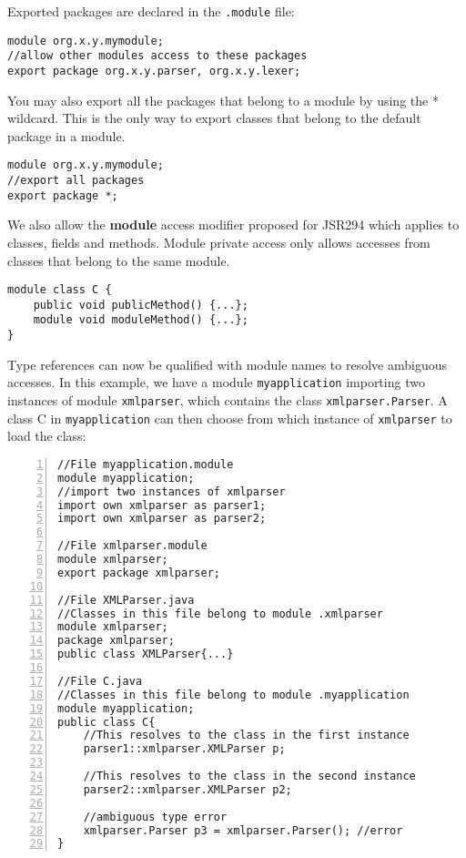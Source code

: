 Exported packages are declared in the {\tt .module} file:

\begin{lstlisting}
module org.x.y.mymodule;
//allow other modules access to these packages
export package org.x.y.parser, org.x.y.lexer;
\end{lstlisting}

You may also export all the packages that belong to a module by using
the * wildcard. This is the only way to export classes that belong to
the default package in a module.

\begin{lstlisting}
module org.x.y.mymodule;
//export all packages
export package *;
\end{lstlisting}

We also allow the \textbf{module} access modifier proposed for JSR294 \cite{JSR294}
which applies to classes, fields and methods. Module private access only allows
accesses from classes that belong to the same module.

\begin{lstlisting}
module class C {
	public void publicMethod() {...};
	module void moduleMethod() {...};
}
\end{lstlisting}


Type references can now be qualified with module names to resolve ambiguous accesses.
In this example, we have a module {\tt myapplication} importing 
two instances of module {\tt xmlparser},
which contains the class {\tt xmlparser.Parser}. 
A class {\tt }C in {\tt myapplication} can then choose from which 
instance of {\tt xmlparser} to load the class:

\begin{lstlisting}[caption=Module Qualified Type References,numbers=left]
//File myapplication.module
module myapplication;
//import two instances of xmlparser
import own xmlparser as parser1; 
import own xmlparser as parser2;

//File xmlparser.module
module xmlparser;
export package xmlparser;

//File XMLParser.java
//Classes in this file belong to module .xmlparser
module xmlparser; 
package xmlparser;
public class XMLParser{...}

//File C.java
//Classes in this file belong to module .myapplication
module myapplication; 
public class C{
	//This resolves to the class in the first instance
	parser1::xmlparser.XMLParser p;
	
	//This resolves to the class in the second instance
	parser2::xmlparser.XMLParser p2;
		
	//ambiguous type error 
	xmlparser.Parser p3 = xmlparser.Parser(); //error
}
\end{lstlisting}

